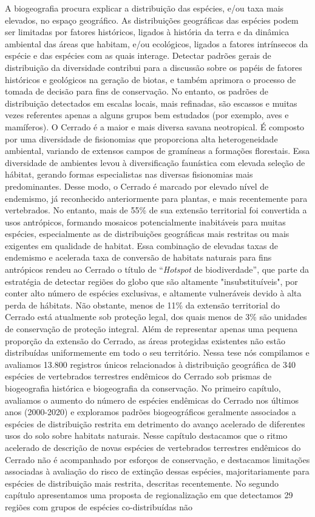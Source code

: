 \documentclass[12pt,openright,oneside,a4paper,english]{abntex2}
\begin{document}
\begin{resumo}[Resumo]
	A biogeografia procura explicar a distribuição das espécies, e/ou taxa mais elevados, no espaço geográfico. As distribuições geográficas das espécies podem ser limitadas por fatores históricos, ligados à história da terra e da dinâmica ambiental das áreas que habitam, e/ou ecológicos, ligados a fatores intrínsecos da espécie e das espécies com as quais interage. Detectar padrões gerais de distribuição da diversidade contribui para a discussão sobre os papéis de fatores históricos e geológicos na geração de biotas, e também aprimora o processo de tomada de decisão para fins de conservação. No entanto, os padrões de distribuição detectados em escalas locais, mais refinadas, são escassos e muitas vezes referentes apenas a alguns grupos bem estudados (por exemplo, aves e mamíferos). O Cerrado é a maior e mais diversa savana neotropical. É composto por uma diversidade de fisionomias que proporciona alta heterogeneidade ambiental, variando de extensos campos de gramíneas a formações florestais. Essa diversidade de ambientes levou à diversificação faunística com elevada seleção de hábitat, gerando formas especialistas nas diversas fisionomias mais predominantes. Desse modo, o Cerrado é marcado por elevado nível de endemismo, já reconhecido anteriormente para plantas, e mais recentemente para vertebrados. No entanto, mais de 55\% de sua extensão territorial foi convertida a usos antrópicos, formando mosaicos potencialmente inabitáveis para muitas espécies, especialmente as de distribuições geográficas mais restritas ou mais exigentes em qualidade de habitat. Essa combinação de elevadas taxas de endemismo e acelerada taxa de conversão de habitats naturais para fins antrópicos rendeu ao Cerrado o título de “\textit{Hotspot} de biodiverdade”, que parte da estratégia de detectar regiões do globo que são altamente "insubstituíveis", por conter alto número de espécies exclusivas, e altamente vulneráveis devido à alta perda de hábitats. Não obstante, menos de 11\% da extensão territorial do Cerrado está atualmente sob proteção legal, dos quais menos de 3\% são unidades de conservação de proteção integral. Além de representar apenas uma pequena proporção da extensão do Cerrado, as áreas protegidas existentes não estão distribuídas uniformemente em todo o seu território. Nessa tese nós compilamos e avaliamos 13.800 registros únicos relacionados à distribuição geográfica de 340 espécies de vertebrados terrestres endêmicos do Cerrado sob prismas de biogeografia histórica e biogeografia da conservação. No primeiro capítulo, avaliamos o aumento do número de espécies endêmicas do Cerrado nos últimos anos (2000-2020) e exploramos padrões biogeográficos geralmente associados a espécies de distribuição restrita em detrimento do avanço acelerado de diferentes usos do solo sobre habitats naturais. Nesse capítulo destacamos que o ritmo acelerado de descrição de novas espécies de vertebrados terrestres endêmicos do Cerrado não é acompanhado por esforços de conservação, e destacamos limitações associadas à avaliação do risco de extinção dessas espécies, majoritariamente para espécies de distribuição mais restrita, descritas recentemente. No segundo capítulo apresentamos uma proposta de regionalização em que detectamos 29 regiões com grupos de espécies co-distribuídas não 
\end{resumo}
\end{document}
